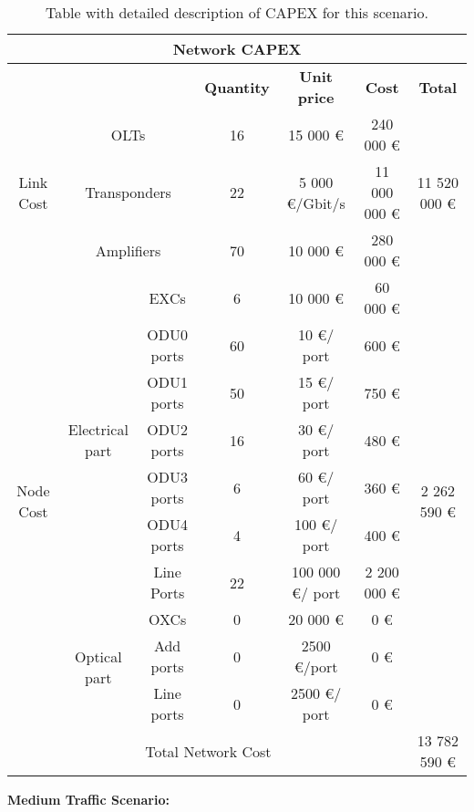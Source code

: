 \begin{table}[H]
	\centering
	\begin{tabular}{| c | c | c | c | c | c | c |}
		\hline
		\multicolumn{7}{|c|}{\textbf{Network CAPEX}} \\ \hline
		\multicolumn{3}{|c|}{} & \textbf{Quantity} & \textbf{Unit price} & \textbf{Cost} & \textbf{Total} \\ \hline
		\multirow{3}{*}{Link Cost} & \multicolumn{2}{c|}{OLTs} & 16 & 15 000 \euro & 240 000 \euro & \multirow{3}{*}{11 520 000 \euro} \\ \cline{2-6}
		& \multicolumn{2}{c|}{Transponders} & 22 & 5 000 \euro /Gbit/s & 11 000 000 \euro &  \\ \cline{2-6}
		& \multicolumn{2}{c|}{Amplifiers} & 70 & 10 000 \euro & 280 000 \euro &  \\ \hline
		\multirow{10}{*}{Node Cost} & \multirow{7}{*}{Electrical part} & EXCs & 6 & 10 000 \euro & 60 000 \euro & \multirow{10}{*}{2 262 590 \euro} \\ \cline{3-6}
		&  & ODU0 ports & 60 & 10 \euro/ port & 600 \euro &  \\ \cline{3-6}
		&  & ODU1 ports & 50 & 15 \euro/ port & 750 \euro &  \\ \cline{3-6}
		&  & ODU2 ports & 16 & 30 \euro/ port & 480 \euro &  \\ \cline{3-6}
		&  & ODU3 ports & 6 & 60 \euro/ port & 360 \euro &  \\ \cline{3-6}
		&  & ODU4 ports & 4 & 100 \euro/ port & 400 \euro &  \\ \cline{3-6}
		&  & Line Ports & 22 & 100 000 \euro/ port & 2 200 000 \euro &  \\ \cline{2-6}
		& \multirow{3}{*}{Optical part} & OXCs & 0 & 20 000 \euro & 0 \euro &  \\ \cline{3-6}
		&  & Add ports & 0 & 2500 \euro/port & 0 \euro &  \\ \cline{3-6}
		&  & Line ports & 0 & 2500 \euro/ port & 0 \euro &  \\ \hline
		\multicolumn{6}{|c|}{Total Network Cost} & 13 782 590 \euro \\ \hline
	\end{tabular}
\caption{Table with detailed description of CAPEX for this scenario.}
\label{capex}
\end{table}

\textbf{Medium Traffic Scenario:}

